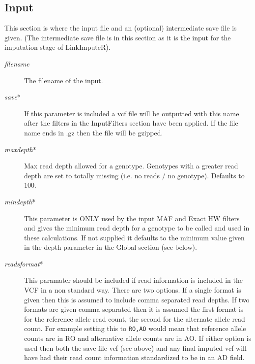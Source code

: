 \documentclass[10pt]{report}
\begin{document}
\subsection{Input}
This section is where the input file and an (optional) intermediate save file is given. (The intermediate save file is in this section as it is the input for the imputation stage of LinkImputeR).
\begin{description}
\item[\emph{filename}] The filename of the input.
\item[\emph{save}*] If this parameter is included a vcf file will be outputted with this name after the filters in the InputFilters section have been applied.  If the file name ends in .gz then the file will be gzipped.
\item[\emph{maxdepth}*] Max read depth allowed for a genotype.  Genotypes with a greater read depth are set to totally missing (i.e. no reads / no genotype). Defaults to 100.
\item[\emph{mindepth}*] This parameter is ONLY used by the input MAF and Exact HW filters and gives the minimum read depth for a genotype to be called and used in these calculations.  If not supplied it defaults to the minimum value given in the depth parameter in the Global section (see below).
\item[\emph{readsformat}*] This paramater should be included if read information is included in the VCF in a non standard way.  There are two options.  If a single format is given then this is assumed to include comma separated read depths.  If two formats are given comma separated then it is assumed the first format is for the reference allele read count, the second for the alternate allele read count.  For example setting this to \texttt{RO,AO} would mean that reference allele counts are in RO and alternative allele counts are in AO.  If either option is used then both the save file vcf (see above) and any final imputed vcf will have had their read count information standardized to be in an AD field.
\end{description}
\end{document}
